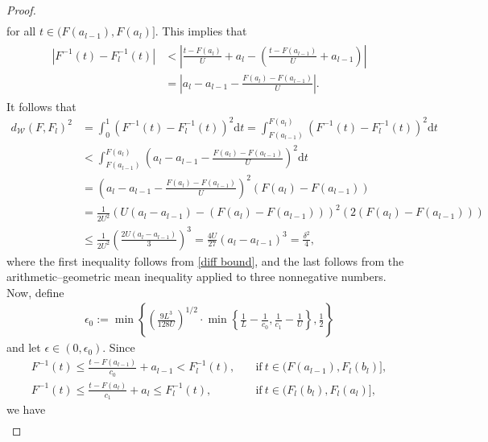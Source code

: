 \documentclass[11pt]{article}
\numberwithin{equation}{section}
\begin{document}
\begin{proof}
\begin{align*}
    \end{align*}
    for all $t\in(F(a_{l-1}),F(a_l)]$.
    This implies that
    \begin{align}\label{diff bound}
    \begin{split}
    |F^{-1}(t)-F^{-1}_l(t)| & < \left|\frac{t-F(a_{l})}{U} + a_{l}-\left(\frac{t-F(a_{l-1})}{U} + a_{l-1}\right) \right| \\
    & = \left|a_{l} - a_{l-1} - \frac{F(a_l) -F(a_{l-1})}{U}\right|.
    \end{split}
    \end{align}
    It follows that
    \begin{align*}
        d_{\mathcal{W}} \left(F, F_l \right)^2 & = \int_0^1 (F^{-1}(t)- F_l^{-1}(t))^2 \mathrm{d}t
        = \int_{F(a_{l-1})}^{F(a_l)} \left(F^{-1}(t) - F_l^{-1}(t) \right)^2 \mathrm{d}t \\
        &< \int_{F(a_{l-1})}^{F(a_l)} \left(a_{l} - a_{l-1} - \frac{F(a_l) -F(a_{l-1})}{U}\right)^2 \mathrm{d}t \\
        & = \left(a_{l} - a_{l-1} - \frac{F(a_l) -F(a_{l-1})}{U}\right)^2 \left( F(a_l) -  F(a_{l-1}) \right) \\
        & = \frac{1}{2U^2} \left(U (a_{l} - a_{l-1}) - (F(a_l) -F(a_{l-1})) \right)^2 \left( 2( F(a_l) -  F(a_{l-1}) ) \right) \\
        & \le \frac{1}{2U^2} \left( \frac{2U(a_{l} - a_{l-1})}{3} \right)^3 = \frac{4U}{27} (a_{l} - a_{l-1})^3 = \frac{\delta^2}{4},
    \end{align*}
    where the first inequality follows from \eqref{diff bound}, and the last follows from the arithmetic--geometric mean inequality applied to three nonnegative numbers. Now, define
    \begin{align*}
        \epsilon_0 := \min \left\{ \left(\frac{9L^3}{128U}\right)^{1/2} \cdot \min \left\{ \frac{1}{L} - \frac{1}{c_0} , \frac{1}{c_1}- \frac{1}{U} \right\}, \frac{1}{2} \right\}
    \end{align*}
    and let $\epsilon \in \left(0, \epsilon_0 \right)$. Since
    \begin{align*}
        F^{-1} (t) \le \frac{t-F(a_{l-1})}{c_0} + a_{l-1} < F_l^{-1} (t), \quad &\text{if}~t \in (F(a_{l-1}), F_l(b_l)], \\
        F^{-1} (t) \le \frac{t-F(a_{l})}{c_1} + a_{l} \le F_l^{-1} (t), \quad &\text{if}~t \in (F_l(b_l), F_l(a_l)],
    \end{align*}
    we have
    \begin{align}\label{some bounds}

\end{align}
\end{proof}
\end{document}
